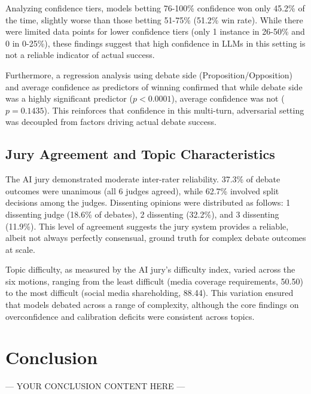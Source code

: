 \documentclass{article}
\begin{document}
Analyzing confidence tiers, models betting 76-100\% confidence won only 45.2\% of the time, slightly worse than those betting 51-75\% (51.2\% win rate). While there were limited data points for lower confidence tiers (only 1 instance in 26-50\% and 0 in 0-25\%), these findings suggest that high confidence in LLMs in this setting is not a reliable indicator of actual success.

Furthermore, a regression analysis using debate side (Proposition/Opposition) and average confidence as predictors of winning confirmed that while debate side was a highly significant predictor ($p < 0.0001$), average confidence was not ($p = 0.1435$). This reinforces that confidence in this multi-turn, adversarial setting was decoupled from factors driving actual debate success.

\subsection{Jury Agreement and Topic Characteristics}

The AI jury demonstrated moderate inter-rater reliability. 37.3\% of debate outcomes were unanimous (all 6 judges agreed), while 62.7\% involved split decisions among the judges. Dissenting opinions were distributed as follows: 1 dissenting judge (18.6\% of debates), 2 dissenting (32.2\%), and 3 dissenting (11.9\%). This level of agreement suggests the jury system provides a reliable, albeit not always perfectly consensual, ground truth for complex debate outcomes at scale.

Topic difficulty, as measured by the AI jury's difficulty index, varied across the six motions, ranging from the least difficult (media coverage requirements, 50.50) to the most difficult (social media shareholding, 88.44). This variation ensured that models debated across a range of complexity, although the core findings on overconfidence and calibration deficits were consistent across topics.



\section{Conclusion}

--- YOUR CONCLUSION CONTENT HERE ---

\end{document}
